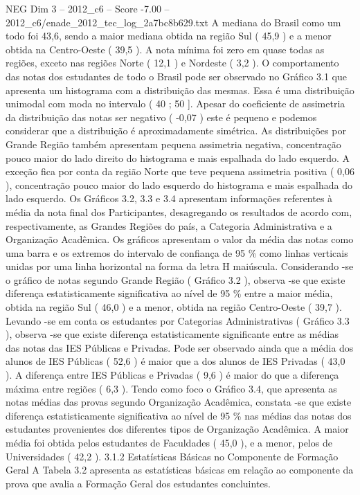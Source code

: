 \begin{textsample}{NEG Dim 3 – 2012\_c6 – Score -7.00 – 2012\_c6/enade\_2012\_tec\_log\_2a7bc8b629.txt}
A mediana do Brasil como um todo foi 43,6, sendo a maior mediana obtida na região Sul ( 45,9 ) e a menor obtida na Centro-Oeste ( 39,5 ).
A nota mínima foi zero em quase todas as regiões, exceto nas regiões Norte ( 12,1 ) e Nordeste ( 3,2 ).
O comportamento das notas dos estudantes de todo o Brasil pode ser observado no Gráfico 3.1 que apresenta um histograma com a distribuição das mesmas.
Essa é uma distribuição unimodal com moda no intervalo ( 40 ; 50 ].
Apesar do coeficiente de assimetria da distribuição das notas ser negativo ( -0,07 ) este é pequeno e podemos considerar que a distribuição é aproximadamente simétrica.
As distribuições por Grande Região também apresentam pequena assimetria negativa, concentração pouco maior do lado direito do histograma e mais espalhada do lado esquerdo.
A exceção fica por conta da região Norte que teve pequena assimetria positiva ( 0,06 ), concentração pouco maior do lado esquerdo do histograma e mais espalhada do lado esquerdo.
Os Gráficos 3.2, 3.3 e 3.4 apresentam informações referentes à média da nota final dos Participantes, desagregando os resultados de acordo com, respectivamente, as Grandes Regiões do país, a Categoria Administrativa e a Organização Acadêmica.
Os gráficos apresentam o valor da média das notas como uma barra e os extremos do intervalo de confiança de 95 \% como linhas verticais unidas por uma linha horizontal na forma da letra H maiúscula.
Considerando -se o gráfico de notas segundo Grande Região ( Gráfico 3.2 ), observa -se que existe diferença estatisticamente significativa ao nível de 95 \% entre a maior média, obtida na região Sul ( 46,0 ) e a menor, obtida na região Centro-Oeste ( 39,7 ).
Levando -se em conta os estudantes por Categorias Administrativas ( Gráfico 3.3 ), observa -se que existe diferença estatisticamente significante entre as médias das notas das IES Públicas e Privadas.
Pode ser observado ainda que a média dos alunos de IES Públicas ( 52,6 ) é maior que a dos alunos de IES Privadas ( 43,0 ).
A diferença entre IES Públicas e Privadas ( 9,6 ) é maior do que a diferença máxima entre regiões ( 6,3 ).
Tendo como foco o Gráfico 3.4, que apresenta as notas médias das provas segundo Organização Acadêmica, constata -se que existe diferença estatisticamente significativa ao nível de 95 \% nas médias das notas dos estudantes provenientes dos diferentes tipos de Organização Acadêmica.
A maior média foi obtida pelos estudantes de Faculdades ( 45,0 ), e a menor, pelos de Universidades ( 42,2 ). 3.1.2 Estatísticas Básicas no Componente de Formação Geral A Tabela 3.2 apresenta as estatísticas básicas em relação ao componente da prova que avalia a Formação Geral dos estudantes concluintes.

\end{textsample}
